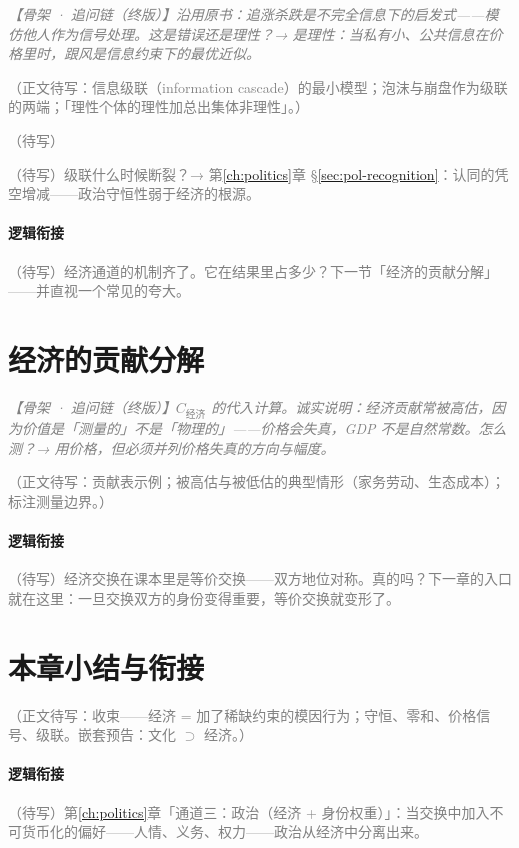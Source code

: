 \documentclass[../../main2.tex]{subfiles}
\begin{document}
	\textcolor{gray}{\textit{【骨架 · 追问链（终版）】沿用原书：追涨杀跌是不完全信息下的启发式——模仿他人作为信号处理。这是错误还是理性？→ 是理性：当私有小、公共信息在价格里时，跟风是信息约束下的最优近似。}}

	\textcolor{gray}{（正文待写：信息级联（information cascade）的最小模型；泡沫与崩盘作为级联的两端；「理性个体的理性加总出集体非理性」。）}

	\begin{readingnote}
		\textcolor{gray}{（待写）}
	\end{readingnote}

	\begin{reader_anticipation}
		\item \textcolor{gray}{（待写）级联什么时候断裂？→ 第\ref{ch:politics}章 §\ref{sec:pol-recognition}：认同的凭空增减——政治守恒性弱于经济的根源。}
	\end{reader_anticipation}

	\paragraph*{逻辑衔接}
	\textcolor{gray}{（待写）经济通道的机制齐了。它在结果里占多少？下一节「经济的贡献分解」——并直视一个常见的夸大。}

	\section{经济的贡献分解}
	\label{sec:econ-contribution}

	\textcolor{gray}{\textit{【骨架 · 追问链（终版）】$C_{\text{经济}}$ 的代入计算。诚实说明：经济贡献常被高估，因为价值是「测量的」不是「物理的」——价格会失真，GDP 不是自然常数。怎么测？→ 用价格，但必须并列价格失真的方向与幅度。}}

	\textcolor{gray}{（正文待写：贡献表示例；被高估与被低估的典型情形（家务劳动、生态成本）；\lowfreq 标注测量边界。）}

	\paragraph*{逻辑衔接}
	\textcolor{gray}{（待写）经济交换在课本里是等价交换——双方地位对称。真的吗？下一章的入口就在这里：一旦交换双方的身份变得重要，等价交换就变形了。}

	\section{本章小结与衔接}
	\label{sec:econ-summary}

	\textcolor{gray}{（正文待写：收束——经济 = 加了稀缺约束的模因行为；守恒、零和、价格信号、级联。嵌套预告：文化 $\supset$ 经济。）}

	\paragraph*{逻辑衔接}
	\textcolor{gray}{（待写）第\ref{ch:politics}章「通道三：政治（经济 + 身份权重）」：当交换中加入不可货币化的偏好——人情、义务、权力——政治从经济中分离出来。}
\end{document}
